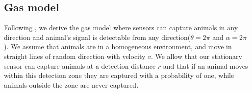 \subsection{Gas model} \label{gas}

Following \cite{yapp1956theory}, we derive the gas model where sensors can capture animals in any direction and animal's signal is detectable from any direction($ \theta =  2\pi$ and $ \alpha =  2\pi$). We assume that animals are in a homogeneous environment, and move in straight lines of random direction with velocity $v$. We allow that our stationary sensor can capture animals at a detection distance $r$ and that if an animal moves within this detection zone they are captured with a probability of one, while animals outside the zone are never captured.

